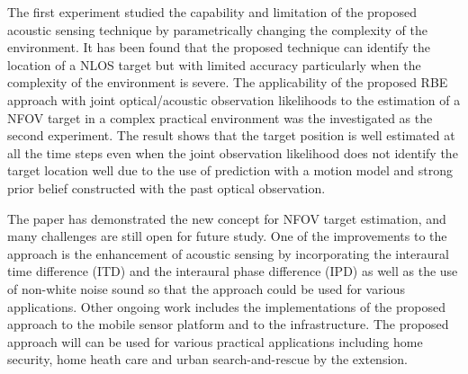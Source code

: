 The first experiment studied the capability and limitation of the proposed acoustic sensing technique by parametrically changing the complexity of the environment.  It has been found that the proposed technique can identify the location of a NLOS target but with limited accuracy particularly when the complexity of the environment is severe.  The applicability of the proposed RBE approach with joint optical/acoustic observation likelihoods to the estimation of a NFOV target in a complex practical environment was the investigated as the second experiment.  The result shows that the target position is well estimated at all the time steps even when the joint observation likelihood does not identify the target location well due to the use of prediction with a motion model and strong prior belief constructed with the past optical observation.  

The paper has demonstrated the new concept for NFOV target estimation, and many challenges are still open for future study.  One of the improvements to the approach is the enhancement of acoustic sensing by incorporating the interaural time difference (ITD) and the interaural phase difference (IPD) as well as the use of non-white noise sound so that the approach could be used for various applications.  Other ongoing work includes the implementations of the proposed approach to the mobile sensor platform and to the infrastructure.  The proposed approach will can be used for various practical applications including home security, home heath care and urban search-and-rescue by the extension.  







